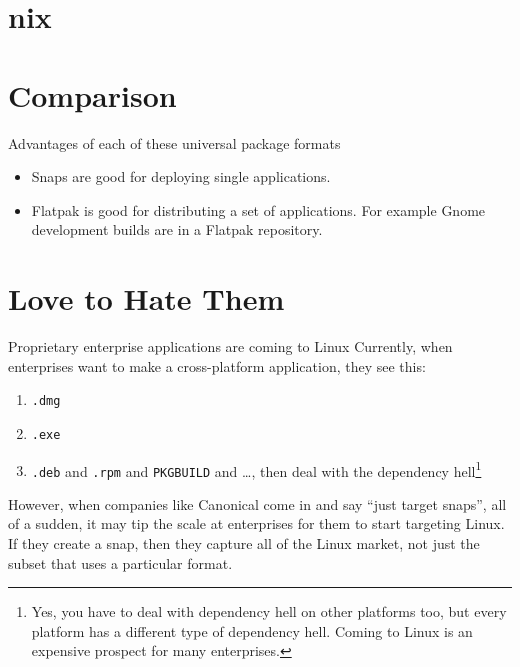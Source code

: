 \documentclass{lug}
\begin{document}
\section{nix}

\section{Comparison}
\begin{frame}{Advantages of each of these universal package formats}
    \begin{itemize}
        \item Snaps are good for deploying single applications.
        \item Flatpak is good for distributing a set of applications. For
            example Gnome development builds are in a Flatpak repository.
    \end{itemize}
\end{frame}

\section{Love to Hate Them}

\begin{frame}{Proprietary enterprise applications are coming to Linux}
    Currently, when enterprises want to make a cross-platform application, they
    see this:
    \begin{enumerate}[leftmargin=2cm]
        \item[macOS] \texttt{.dmg}
        \item[Windows] \texttt{.exe}
        \item[Linux] \texttt{.deb} and \texttt{.rpm} and \texttt{PKGBUILD} and
            \dots, then deal with the dependency hell\footnote[frame]{Yes, you
            have to deal with dependency hell on other platforms too, but every
            platform has a different type of dependency hell. Coming to Linux is
            an expensive prospect for many enterprises.}
    \end{enumerate}

    However, when companies like Canonical come in and say ``just target
    snaps'', all of a sudden, it may tip the scale at enterprises for them to
    start targeting Linux. If they create a snap, then they capture all of the
    Linux market, not just the subset that uses a particular format.
\end{frame}
\end{document}

